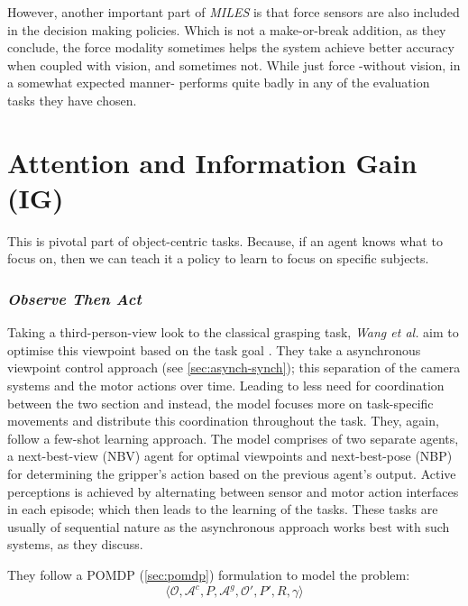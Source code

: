 However, another important part of \emph{MILES} is that force sensors are also included in the decision making policies. Which is not a make-or-break addition, as they conclude, the force modality sometimes helps the system achieve better accuracy when coupled with vision, and sometimes not. While just force -without vision, in a somewhat expected manner- performs quite badly in any of the evaluation tasks they have chosen. 




\section{Attention and Information Gain (IG)}
This is pivotal part of object-centric tasks. Because, if an agent knows what to focus on, then we can teach it a policy to learn to focus on specific subjects.

\subsubsection{\emph{Observe Then Act}}
Taking a third-person-view look to the classical grasping task, \emph{Wang et al.} aim to optimise this viewpoint based on the task goal \cite{wang2024observeactasynchronousactive}. They take a asynchronous viewpoint control approach (see \ref{sec:asynch-synch}); this separation of the camera systems and the motor actions over time. Leading to less need for coordination between the two section and instead, the model focuses more on task-specific movements and distribute this coordination throughout the task. 
They, again, follow a few-shot learning approach. The model comprises of two separate agents, a next-best-view (NBV) agent for optimal viewpoints and next-best-pose (NBP) for determining the gripper's action based on the previous agent's output. Active perceptions is achieved by alternating between sensor and motor action interfaces in each episode; which then leads to the learning of the tasks. These tasks are usually of sequential nature as the asynchronous approach works best with such systems, as they discuss.

They follow a POMDP (\ref{sec:pomdp}) formulation to model the problem:
\[
  \langle \mathcal{O}, \mathcal{A}^c, P, \mathcal{A}^g, \mathcal{O}', P', R, \gamma \rangle
\]

